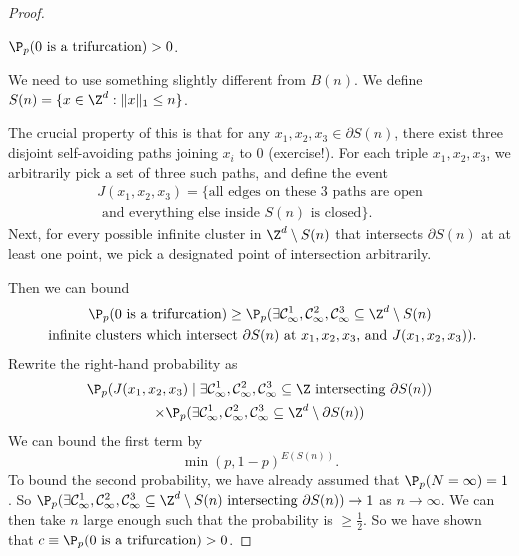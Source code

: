 \documentclass[a4paper]{article}
\begin{document}
\begin{proof}
  \begin{claim}
    $\P_p(0\text{ is a trifurcation}) > 0$.
  \end{claim}
  We need to use something slightly different from $B(n)$. We define $S(n) = \{x \in \Z^d: \|x\|_1 \leq n\}$.
  \begin{center}
  \end{center}
  The crucial property of this is that for any $x_1, x_2, x_3 \in \partial S(n)$, there exist three disjoint self-avoiding paths joining $x_i$ to $0$ (exercise!). For each triple $x_1, x_2, x_3$, we arbitrarily pick a set of three such paths, and define the event
  \begin{multline*}
    J(x_1, x_2, x_3) = \{\text{all edges on these 3 paths are open}\\\text{ and everything else inside $S(n)$ is closed}\}.
  \end{multline*}
  Next, for every possible infinite cluster in $\Z^d \setminus S(n)$ that intersects $\partial S(n)$ at at least one point, we pick a designated point of intersection arbitrarily.

  Then we can bound
  \begin{multline*}
    \P_p(0 \text{ is a trifurcation}) \geq \P_p(\exists \mathcal{C}_\infty^1, \mathcal{C}_\infty^2, \mathcal{C}_\infty^3 \subseteq \Z^d \setminus S(n)\\ \text{ infinite clusters which intersect $\partial S(n)$ at $x_1, x_2, x_3$, and $J(x_1, x_2, x_3)$}).
  \end{multline*}
  Rewrite the right-hand probability as
  \begin{multline*}
    \P_p(J(x_1, x_2, x_3) \mid\exists \mathcal{C}_\infty^1, \mathcal{C}_\infty^2, \mathcal{C}_\infty^3 \subseteq \Z\text{ intersecting }\partial S(n))\\
    \times \P_p(\exists \mathcal{C}_\infty^1, \mathcal{C}_\infty^2, \mathcal{C}_\infty^3 \subseteq \Z^d \setminus \partial S(n))
  \end{multline*}
  We can bound the first term by
  \[
    \min(p, 1 - p)^{E(S(n))}.
  \]
  To bound the second probability, we have already assumed that $\P_p(N = \infty) = 1$. So $\P_p(\exists \mathcal{C}_\infty^1, \mathcal{C}_\infty^2, \mathcal{C}_\infty^3 \subseteq \Z^d \setminus S(n)\text{ intersecting }\partial S(n)) \to 1$ as $n \to \infty$. We can then take $n$ large enough such that the probability is $\geq \frac{1}{2}$. So we have shown that $c \equiv \P_p(0\text{ is a trifurcation}) > 0$.


\end{proof}
\end{document}
